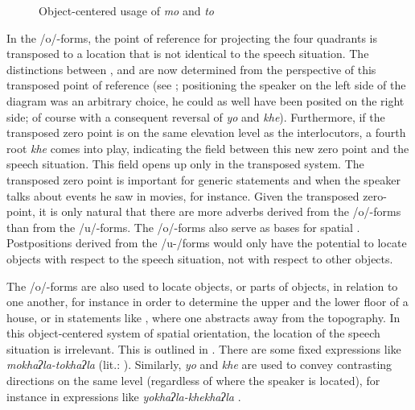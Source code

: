 \begin{figure}
\centering
\setlength{\fboxsep}{0pt}
\caption{Object-centered usage of \emph{mo} and \emph{to}}\label{deicticschema-3}
\end{figure}


In the /o/-forms, the point of reference for  projecting the four quadrants is transposed to a location that is not identical to the speech situation. The distinctions between ,  and  are now determined from the perspective of this transposed point of reference (see ; positioning  the speaker on the left side of the diagram was an arbitrary choice, he could as well have been posited on the right side; of course with a consequent reversal of \emph{yo} and \emph{khe}). Furthermore, if the transposed zero point is on the same elevation level as the interlocutors, a fourth root \emph{khe} comes into play, indicating the field between this new zero point and the speech situation. This field opens up only in the transposed system. The transposed zero point is important for generic statements and when the speaker talks about events he saw in movies, for instance. Given the transposed zero-point, it is only natural that there are more adverbs derived from the /o/-forms than from the /u/-forms. The  /o/-forms also serve as bases for spatial . Postpositions derived from the /u-/forms would only have the potential to locate objects with respect to the speech situation, not with respect to other objects.

The /o/-forms are also used to locate objects, or parts of objects, in relation to one another, for instance in order to determine the upper and the lower floor of a house, or in statements like , where one abstracts away from the topography. In this object-centered system of spatial orientation, the location of the speech situation is irrelevant.  This is outlined in .  There are some fixed expressions like \emph{mokhaʔla-tokhaʔla}  (lit.: ). Similarly, \emph{yo} and \emph{khe} are used to convey contrasting directions on the same level (regardless of where the speaker is located), for instance in expressions like \emph{yokhaʔla-khekhaʔla} .

